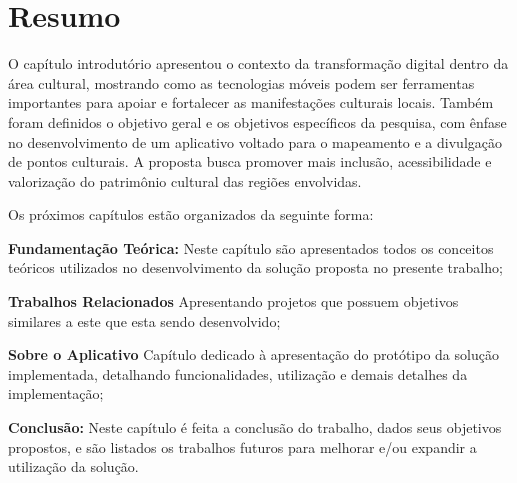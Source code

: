 \section*{Resumo}

O capítulo introdutório apresentou o contexto da transformação digital dentro da área cultural, mostrando como as tecnologias móveis podem ser ferramentas importantes para apoiar e fortalecer as manifestações culturais locais. Também foram definidos o objetivo geral e os objetivos específicos da pesquisa, com ênfase no desenvolvimento de um aplicativo voltado para o mapeamento e a divulgação de pontos culturais. A proposta busca promover mais inclusão, acessibilidade e valorização do patrimônio cultural das regiões envolvidas.

Os próximos capítulos estão organizados da seguinte forma:

\begin{lista}
  \item \textbf{Fundamentação Teórica:} Neste capítulo são apresentados todos os conceitos teóricos utilizados no desenvolvimento da solução proposta no presente trabalho;
  \item \textbf{Trabalhos Relacionados} Apresentando projetos que possuem objetivos similares a este que esta sendo desenvolvido;
  \item \textbf{Sobre o Aplicativo} Capítulo dedicado à apresentação do protótipo da solução implementada, detalhando funcionalidades, utilização e demais detalhes da implementação;
  \item \textbf{Conclusão:} Neste capítulo é feita a conclusão do trabalho, dados seus objetivos propostos, e são listados os trabalhos futuros para melhorar e/ou expandir a utilização da solução.
\end{lista}